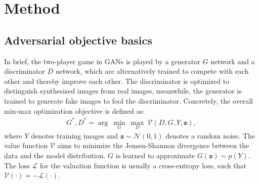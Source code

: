 \documentclass[10pt,twocolumn,letterpaper]{article}
\begin{document}
\section{Method}

\subsection{Adversarial objective basics}
In brief, the two-player game in GANs \cite{goodfellow2014generative} is played by a generator $G$ network and a discriminator $D$ network, which are alternatively trained to compete with each other and thereby improve each other. The discriminator is optimized to distinguish synthesized images from real images, meanwhile, the generator is trained to generate fake images to fool the discriminator. Concretely, the overall min-max optimization objective is defined as: 
\begin{equation}
\label{equ:GAN}
\begin{split}
G^*, D^* = \arg~\underset{G}{\min}\ \underset{D}{\max}~ \mathcal{V}(D, G, Y, \bm z),
\end{split}
\end{equation}
where $Y$ denotes training images and $\bm z\sim\mathcal{N}(0,1)$ denotes a random noise. The value function $\mathcal{V}$ aims to minimize the Jensen-Shannon divergence between the data and the model distribution. $G$ is learned to approximate $G(\bm z) \sim p(Y)$.  The loss $\mathcal{L}$ for the valuation function is usually a cross-entropy loss, such that $\mathcal{V}(\cdot) = - \mathcal{L}(\cdot)$. 


\end{document}
